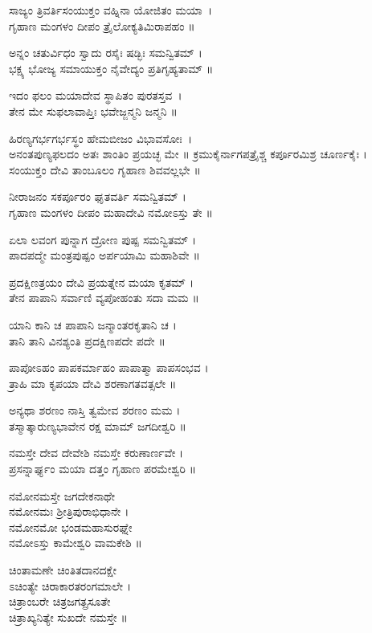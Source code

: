 ಸಾಜ್ಯಂ ತ್ರಿವರ್ತಿಸಂಯುಕ್ತಂ ವಹ್ನಿನಾ ಯೋಜಿತಂ ಮಯಾ~।\\
ಗೃಹಾಣ ಮಂಗಳಂ ದೀಪಂ ತ್ರೈಲೋಕ್ಯತಿಮಿರಾಪಹಂ ॥

ಅನ್ನಂ ಚತುರ್ವಿಧಂ ಸ್ವಾದು ರಸೈಃ ಷಡ್ಭಿಃ ಸಮನ್ವಿತಮ್ ।\\
ಭಕ್ಷ್ಯ ಭೋಜ್ಯ ಸಮಾಯುಕ್ತಂ ನೈವೇದ್ಯಂ ಪ್ರತಿಗೃಹ್ಯತಾಮ್ ॥

ಇದಂ ಫಲಂ ಮಯಾದೇವ ಸ್ಥಾಪಿತಂ ಪುರತಸ್ತವ~।\\
ತೇನ ಮೇ ಸುಫಲಾವಾಪ್ತಿಃ ಭವೇಜ್ಜನ್ಮನಿ ಜನ್ಮನಿ ॥

ಹಿರಣ್ಯಗರ್ಭಗರ್ಭಸ್ಥಂ ಹೇಮಬೀಜಂ ವಿಭಾವಸೋಃ~।\\
ಅನಂತಪುಣ್ಯಫಲದಂ ಅತಃ ಶಾಂತಿಂ ಪ್ರಯಚ್ಛ ಮೇ ॥
\newpage
ಕ್ರಮುಕೈರ್ನಾಗಪತ್ರೈಶ್ಚ ಕರ್ಪೂರಮಿಶ್ರ ಚೂರ್ಣಕೈಃ ।\\
ಸಂಯುಕ್ತಂ ದೇವಿ ತಾಂಬೂಲಂ ಗೃಹಾಣ ಶಿವವಲ್ಲಭೇ ॥

ನೀರಾಜನಂ ಸಕರ್ಪೂರಂ ಘೃತವರ್ತಿ ಸಮನ್ವಿತಮ್ ।\\
ಗೃಹಾಣ ಮಂಗಳಂ ದೀಪಂ ಮಹಾದೇವಿ ನಮೋಽಸ್ತು ತೇ ॥

ಏಲಾ ಲವಂಗ ಪುನ್ನಾಗ ದ್ರೋಣ ಪುಷ್ಪ ಸಮನ್ವಿತಮ್ ।\\
ಪಾದಪದ್ಮೇ ಮಂತ್ರಪುಷ್ಪಂ ಅರ್ಪಯಾಮಿ ಮಹಾಶಿವೇ ॥

ಪ್ರದಕ್ಷಿಣತ್ರಯಂ ದೇವಿ ಪ್ರಯತ್ನೇನ ಮಯಾ ಕೃತಮ್ ।\\
ತೇನ ಪಾಪಾನಿ ಸರ್ವಾಣಿ ವ್ಯಪೋಹಂತು ಸದಾ ಮಮ ॥

ಯಾನಿ ಕಾನಿ ಚ ಪಾಪಾನಿ ಜನ್ಮಾಂತರಕೃತಾನಿ ಚ ।\\
ತಾನಿ ತಾನಿ ವಿನಶ್ಯಂತಿ ಪ್ರದಕ್ಷಿಣಪದೇ ಪದೇ ॥

ಪಾಪೋಽಹಂ ಪಾಪಕರ್ಮಾಹಂ ಪಾಪಾತ್ಮಾ ಪಾಪಸಂಭವ ।\\
ತ್ರಾಹಿ ಮಾ ಕೃಪಯಾ ದೇವಿ ಶರಣಾಗತವತ್ಸಲೇ ॥

ಅನ್ಯಥಾ ಶರಣಂ ನಾಸ್ತಿ ತ್ವಮೇವ ಶರಣಂ ಮಮ ।\\
ತಸ್ಮಾತ್ಕಾರುಣ್ಯಭಾವೇನ ರಕ್ಷ ಮಾಮ್ ಜಗದೀಶ್ವರಿ ॥

ನಮಸ್ತೇ ದೇವ ದೇವೇಶಿ ನಮಸ್ತೇ ಕರುಣಾರ್ಣವೇ ।\\
ಪ್ರಸನ್ನಾರ್ಘ್ಯಂ ಮಯಾ ದತ್ತಂ ಗೃಹಾಣ ಪರಮೇಶ್ವರಿ ॥

ನಮೋನಮಸ್ತೇ ಜಗದೇಕನಾಥೇ\\ ನಮೋನಮಃ ಶ್ರೀತ್ರಿಪುರಾಭಿಧಾನೇ ।\\
ನಮೋನಮೋ ಭಂಡಮಹಾಸುರಘ್ನೇ\\ ನಮೋಽಸ್ತು ಕಾಮೇಶ್ವರಿ ವಾಮಕೇಶಿ ॥

ಚಿಂತಾಮಣೇ ಚಿಂತಿತದಾನದಕ್ಷೇ\\ಽಚಿಂತ್ಯೇ ಚಿರಾಕಾರತರಂಗಮಾಲೇ ।\\
ಚಿತ್ರಾಂಬರೇ ಚಿತ್ರಜಗತ್ಪ್ರಸೂತೇ\\ ಚಿತ್ರಾಖ್ಯನಿತ್ಯೇ ಸುಖದೇ ನಮಸ್ತೇ ॥


